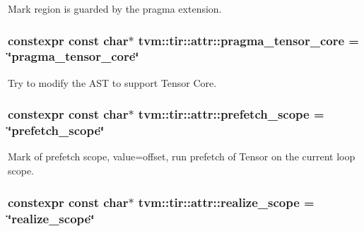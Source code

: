Mark region is guarded by the pragma extension. 

\subsubsection[{\texorpdfstring{pragma\+\_\+tensor\+\_\+core}{pragma_tensor_core}}]{\setlength{\rightskip}{0pt plus 5cm}constexpr const char$\ast$ tvm\+::tir\+::attr\+::pragma\+\_\+tensor\+\_\+core = \char`\"{}pragma\+\_\+tensor\+\_\+core\char`\"{}}\hypertarget{namespacetvm_1_1tir_1_1attr_a96774004fd5b6411f6c37b8923b71834}{}\label{namespacetvm_1_1tir_1_1attr_a96774004fd5b6411f6c37b8923b71834}


Try to modify the A\+ST to support Tensor Core. 

\subsubsection[{\texorpdfstring{prefetch\+\_\+scope}{prefetch_scope}}]{\setlength{\rightskip}{0pt plus 5cm}constexpr const char$\ast$ tvm\+::tir\+::attr\+::prefetch\+\_\+scope = \char`\"{}prefetch\+\_\+scope\char`\"{}}\hypertarget{namespacetvm_1_1tir_1_1attr_ac95fbd1c09a60b10c7a5d07f6c4b68a6}{}\label{namespacetvm_1_1tir_1_1attr_ac95fbd1c09a60b10c7a5d07f6c4b68a6}


Mark of prefetch scope, value=offset, run prefetch of Tensor on the current loop scope. 

\subsubsection[{\texorpdfstring{realize\+\_\+scope}{realize_scope}}]{\setlength{\rightskip}{0pt plus 5cm}constexpr const char$\ast$ tvm\+::tir\+::attr\+::realize\+\_\+scope = \char`\"{}realize\+\_\+scope\char`\"{}}\hypertarget{namespacetvm_1_1tir_1_1attr_acf70bbdafa7344811d336422bf95cdc5}{}\label{namespacetvm_1_1tir_1_1attr_acf70bbdafa7344811d336422bf95cdc5}


